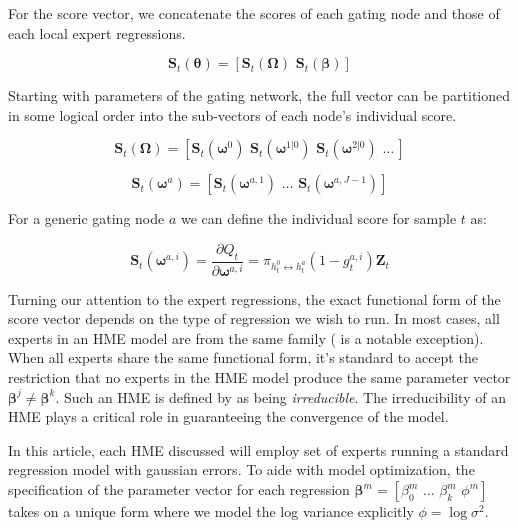 \documentclass[12pt]{article}
\newcommand{\gateprod}[2]{\pi_{#1 \longleftrightarrow #2}}
\begin{document}
For the score vector, we concatenate the scores of each gating node and those of each
local expert regressions.

\begin{equation}
  \boldsymbol{S}_{t}(\boldsymbol{\theta}) = [ \boldsymbol{S}_{t}(\boldsymbol{\Omega}) \,\, \boldsymbol{S}_{t}(\boldsymbol{\beta}) ]
\end{equation}

Starting with parameters of the gating network, the full vector can be partitioned 
in some logical order into the sub-vectors of each node's individual
score.

\begin{equation}
  \boldsymbol{S}_{t}(\boldsymbol{\Omega}) = [ \boldsymbol{S}_{t}(\boldsymbol{\omega}^{0}) \,\, \boldsymbol{S}_{t}(\boldsymbol{\omega}^{1 | 0}) \,\, \boldsymbol{S}_{t}(\boldsymbol{\omega}^{2 | 0}) \,\, \ldots \, ]
\end{equation}

\begin{equation}
  \boldsymbol{S}_{t}(\boldsymbol{\omega}^{a}) = [ \boldsymbol{S}_{t}(\boldsymbol{\omega}^{a, 1}) \,\, \ldots \,\, \boldsymbol{S}_{t}(\boldsymbol{\omega}^{a, J - 1}) ]
\end{equation}

For a generic gating node $a$ we can define the individual score for 
sample $t$ as:

\begin{equation} \label{eq:gateScore}
  \boldsymbol{S}_{t}(\boldsymbol{\omega}^{a, i}) = \frac{\partial Q_{t}}{\partial \boldsymbol{\omega}^{a,i}} = \gateprod{h^{0}_{t}}{h^{a}_{t}} (1 - g^{a, i}_{t}) \boldsymbol{Z}_{t} 
\end{equation}




Turning our attention to the expert regressions, the exact functional form
of the score vector depends on the type of regression we wish to run. In most
cases, all experts in an HME model are from the same family
(\cite{HuertaJiangTanner2003} is a notable exception). When all experts share
the same functional form, it's standard to accept the restriction that no experts
in the HME model produce the same parameter vector
$\boldsymbol{\beta}^{j} \neq \boldsymbol{\beta}^{k}$. Such an HME is defined by
\cite{JiangTanner2000} as being \textit{irreducible}. The irreducibility of an HME
plays a critical role in guaranteeing the convergence of the model.

In this article, each HME discussed will employ set of experts running 
a standard regression model with gaussian errors. To aide with model optimization,
the specification of the parameter vector for each regression
 $\boldsymbol{\beta}^{m} = [\beta_{0}^{m} \,\, \ldots \,\, \beta_{k}^m \,\, \phi^{m}]$
takes on a unique form where we model the log variance explicitly
$\phi = \log \sigma^{2}$.
\end{document}
